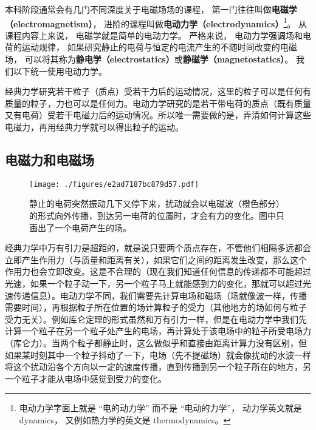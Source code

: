 
\begin{issues}
\issueTODO
\end{issues}


本科阶段通常会有几门不同深度关于电磁场场的课程， 第一门往往叫做\textbf{电磁学（electromagnetism）}， 进阶的课程叫做\textbf{电动力学（electrodynamics）}\footnote{电动力学字面上就是 “电的动力学” 而不是 “电动的力学”， 动力学英文就是 dynamics， 又例如热力学的英文是 thermodynamics。}。 从课程内容上来说， 电磁学就是简单的电动力学。 严格来说， 电动力学强调场和电荷的运动规律， 如果研究静止的电荷与恒定的电流产生的不随时间改变的电磁场， 可以将其称为\textbf{静电学（electrostatics）}或\textbf{静磁学（magnetostatics）}。 我们以下统一使用电动力学。

经典力学研究若干粒子（质点）受若干力后的运动情况，这里的粒子可以是任何有质量的粒子，力也可以是任何力。电动力学研究的是若干带电荷的质点（既有质量又有电荷）受若干电磁力后的运动情况。所以唯一需要做的是，弄清如何计算这些电磁力，再用经典力学就可以得出粒子的运动。

\subsection{电磁力和电磁场}

\begin{figure}[ht]
\centering
\texttt{[image: ./figures/e2ad7187bc879d57.pdf]}
\caption{静止的电荷突然振动几下又停下来，扰动就会以电磁波（橙色部分）的形式向外传播，到达另一电荷的位置时，才会有力的变化。图中只画出了一个电荷产生的场。} \label{fig_EM0_1}
\end{figure}

经典力学中万有引力是超距的，就是说只要两个质点存在，不管他们相隔多远都会立即产生作用力（与质量和距离有关），如果它们之间的距离发生改变，那么这个作用力也会立即改变。这是不合理的（现在我们知道任何信息的传递都不可能超过光速，如果一个粒子动一下，另一个粒子马上就能感到力的变化，那就可以超过光速传递信息）。电动力学不同，我们需要先计算电场和磁场（场就像波一样，传播需要时间），再根据粒子所在位置的场计算粒子的受力（其他地方的场如何与粒子受力无关）。例如库仑定理的形式虽然和万有引力一样，但是在电动力学中我们先计算一个粒子在另一个粒子处产生的电场，再计算处于该电场中的粒子所受电场力（库仑力）。当两个粒子都静止时，这么做似乎和直接由距离计算力没有区别，但如果某时刻其中一个粒子抖动了一下，电场（先不提磁场）就会像扰动的水波一样将这个扰动沿各个方向以一定的速度传播，直到传播到另一个粒子所在的地方，另一个粒子才能从电场中感觉到受力的变化。

